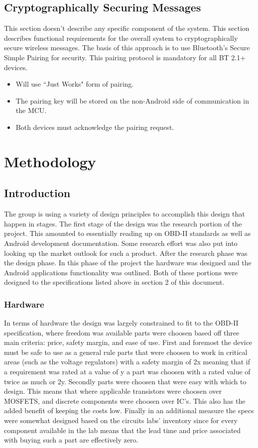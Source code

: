 \documentclass[12pt,letterpaper]{article}
\begin{document}
\subsection{Cryptographically Securing Messages}
This section doesn't describe any specific component of the system. This section describes functional requirements for the overall system to cryptographically secure wireless messages. The basis of this approach is to use Bluetooth's Secure Simple Pairing for security. This pairing protocol is mandatory for all BT 2.1+ devices.

\begin{itemize}
	\item Will use ``Just Works" form of pairing.
	\item The pairing key will be stored on the non-Android side of communication in the MCU.
	\item Both devices must acknowledge the pairing request.
\end{itemize}

\section{Methodology}
\subsection{Introduction}
The group is using a variety of design principles to accomplish this design that happen in stages. The first stage of the design was the research portion of the project. This amounted to essentially reading up on OBD-II standards as well as Android development documentation. Some research effort was also put into looking up the market outlook for such a product. After the research phase was the design phase. In this phase of the project the hardware was designed and the Android applications functionality was outlined. Both of these portions were designed to the specifications listed above in section 2 of this document. \\

\subsubsection{Hardware}
In terms of hardware the design was largely constrained to fit to the OBD-II specification, where freedom was available parts were choosen based off three main criteria: price, safety margin, and ease of use. First and foremost the device must be safe to use as a general rule parts that were choosen to work in critical areas (such as the voltage regulators) with a safety margin of 2x meaning that if a requirement was rated at a value of y a part was choosen with a rated value of twice as much or 2y. Secondly parts were choosen that were easy with which to design. This means that where applicable transistors were choosen over MOSFETS, and discrete components were choosen over IC's. This also has the added benefit of keeping the costs low. Finally in an additional measure the specs were somewhat designed based on the circuits labs' inventory since for every component available in the lab means that the lead time and price associated with buying such a part are effectively zero. 
\end{document}
